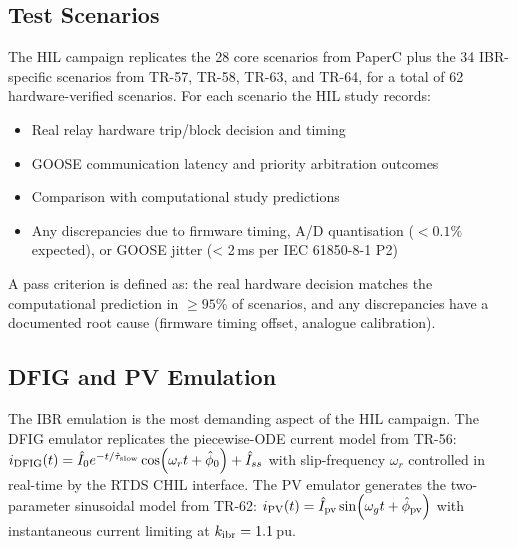 \subsection{Test Scenarios}

The HIL campaign replicates the 28 core scenarios from PaperC plus the
34 IBR-specific scenarios from TR-57, TR-58, TR-63, and TR-64, for a total
of 62 hardware-verified scenarios.  For each scenario the HIL study records:
\begin{itemize}
  \item Real relay hardware trip/block decision and timing
  \item GOOSE communication latency and priority arbitration outcomes
  \item Comparison with computational study predictions
  \item Any discrepancies due to firmware timing, A/D quantisation ($< 0.1\%$
    expected), or GOOSE jitter (< 2\,ms per IEC 61850-8-1 P2)
\end{itemize}

A pass criterion is defined as: the real hardware decision matches the
computational prediction in $\geq 95\%$ of scenarios, and any discrepancies
have a documented root cause (firmware timing offset, analogue calibration).

\subsection{DFIG and PV Emulation}

The IBR emulation is the most demanding aspect of the HIL campaign.
The DFIG emulator replicates the piecewise-ODE current model from TR-56:
$i_{\rm DFIG}(t) = \hat{I}_0 e^{-t/\hat{\tau}_{\rm slow}} \cos(\omega_r t
+ \hat{\phi}_0) + \hat{I}_{ss}$ with slip-frequency $\omega_r$ controlled
in real-time by the RTDS CHIL interface.  The PV emulator generates the
two-parameter sinusoidal model from TR-62:
$i_{\rm PV}(t) = \hat{I}_{\rm pv} \sin(\omega_g t + \hat{\phi}_{\rm pv})$
with instantaneous current limiting at $k_{\rm ibr} = 1.1$\,pu.

